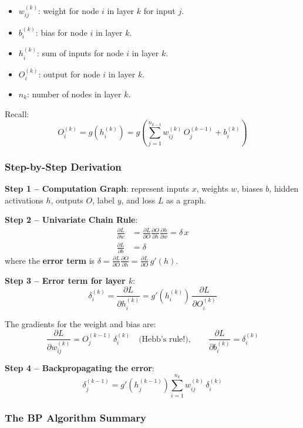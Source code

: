 \documentclass[11pt,a4paper]{article}
\begin{document}
\begin{itemize}[leftmargin=*]
    \item $w_{ij}^{(k)}$: weight for node $i$ in layer $k$ for input $j$.
    \item $b_i^{(k)}$: bias for node $i$ in layer $k$.
    \item $h_i^{(k)}$: sum of inputs for node $i$ in layer $k$.
    \item $O_i^{(k)}$: output for node $i$ in layer $k$.
    \item $n_k$: number of nodes in layer $k$.
\end{itemize}

Recall:
\[
O_i^{(k)} = g(h_i^{(k)}) = g\!\left(\sum_{j=1}^{n_{k-1}} w_{ij}^{(k)}\, O_j^{(k-1)} + b_i^{(k)}\right)
\]

\subsubsection{Step-by-Step Derivation}

\textbf{Step 1 -- Computation Graph}: represent inputs $x$, weights $w$, biases $b$, hidden activations $h$, outputs $O$, label $y$, and loss $L$ as a graph.

\textbf{Step 2 -- Univariate Chain Rule}:
\begin{align*}
\frac{\partial L}{\partial w} &= \frac{\partial L}{\partial O}\frac{\partial O}{\partial h}\frac{\partial h}{\partial w} = \delta\, x \\
\frac{\partial L}{\partial b} &= \delta
\end{align*}
where the \textbf{error term} is $\delta = \frac{\partial L}{\partial O}\frac{\partial O}{\partial h} = \frac{\partial L}{\partial O}\, g'(h)$.

\textbf{Step 3 -- Error term for layer $k$}:
\[
\delta_i^{(k)} = \frac{\partial L}{\partial h_i^{(k)}} = g'(h_i^{(k)})\,\frac{\partial L}{\partial O_i^{(k)}}
\]

The gradients for the weight and bias are:
\[
\frac{\partial L}{\partial w_{ij}^{(k)}} = O_j^{(k-1)}\,\delta_i^{(k)} \quad\text{(Hebb's rule!)}, \qquad
\frac{\partial L}{\partial b_i^{(k)}} = \delta_i^{(k)}
\]

\textbf{Step 4 -- Backpropagating the error}:
\[
\delta_j^{(k-1)} = g'(h_j^{(k-1)})\sum_{i=1}^{n_k} w_{ij}^{(k)}\,\delta_i^{(k)}
\]

\subsubsection{The BP Algorithm Summary}
\end{document}
